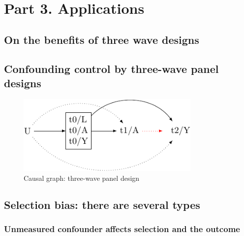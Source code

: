 \documentclass[
  singlecolumn]{report}
\begin{document}
\hypertarget{part-3.-applications}{%
\section{Part 3. Applications}\label{part-3.-applications}}

\hypertarget{on-the-benefits-of-three-wave-designs}{%
\subsection{On the benefits of three wave
designs}\label{on-the-benefits-of-three-wave-designs}}

\hypertarget{confounding-control-by-three-wave-panel-designs}{%
\subsection{Confounding control by three-wave panel
designs}\label{confounding-control-by-three-wave-panel-designs}}

\begin{figure}

{\centering \includegraphics[width=0.8\textwidth,height=\textheight]{causal-dags_files/figure-pdf/fig-dag-6-1.pdf}

}

\caption{\label{fig-dag-6}Causal graph: three-wave panel design}

\end{figure}

\hypertarget{selection-bias-there-are-several-types}{%
\subsection{Selection bias: there are several
types}\label{selection-bias-there-are-several-types}}

\hypertarget{unmeasured-confounder-affects-selection-and-the-outcome}{%
\subsubsection{Unmeasured confounder affects selection and the
outcome}\label{unmeasured-confounder-affects-selection-and-the-outcome}}
\end{document}

